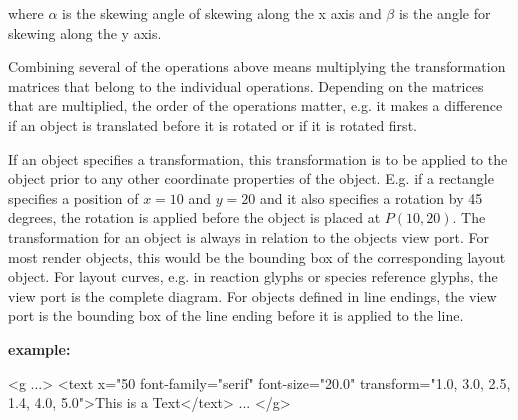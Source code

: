 where $\alpha$ is the skewing angle of skewing along the x axis and $\beta$ is the angle for skewing along the y axis.

Combining several of the operations above means multiplying the transformation matrices that belong to the individual operations.
Depending on the matrices that are multiplied, the order of the operations matter, e.g. it makes a difference if an object is translated before it is rotated or if it is rotated first.

If an object specifies a transformation, this transformation is to be applied to the object prior to any other coordinate properties of the object. E.g. if a rectangle specifies a position of $x=10$ and $y=20$ and it also specifies a rotation by 45 degrees, the rotation is applied before the object is placed at $P(10,20)$.
The transformation for an object is always in relation to the objects view port. For most render objects, this would be the bounding box of the corresponding layout object. For layout curves, e.g. in reaction glyphs or species reference glyphs, the view port is the complete diagram.
For objects defined in line endings, the view port is the bounding box of the line ending before it is applied to the line.

\vspace*{0.25cm}
{\large
{\bf
example:
}
}

{\footnotesize
\begin{example}
 <g ...>
   <text x="50%
        font-family="serif" font-size="20.0" 
        transform="1.0, 3.0, 2.5, 1.4, 4.0, 5.0">This is a Text</text>
      ...
</g> 
\end{example}
}

